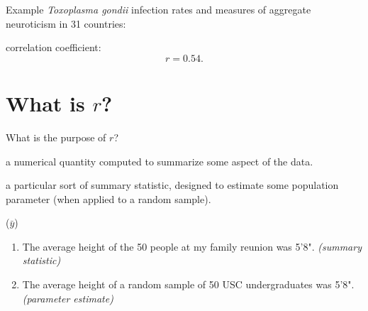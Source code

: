 \begin{frame}{Example}
  \textit{Toxoplasma gondii} infection rates and measures of aggregate neuroticism in 31 countries:

    correlation coefficient:
    \[ r = 0.54 .  \]

\end{frame}

\section{What is $r$?}

\begin{frame}{What is the purpose of $r$?}

   a numerical quantity computed to summarize some aspect of the data.

    \vspace{1em}

   a particular sort of summary statistic, designed to estimate some population parameter (when applied to a random sample).

    \vspace{2em}

   ($\bar y$)
  \begin{enumerate}
    \item The average height of the 50 people at my family reunion was 5'8". \alert{\it (summary statistic)}
    \item The average height of a random sample of 50 USC undergraduates was 5'8". \alert{\it (parameter estimate)}
  \end{enumerate}

\end{frame}

